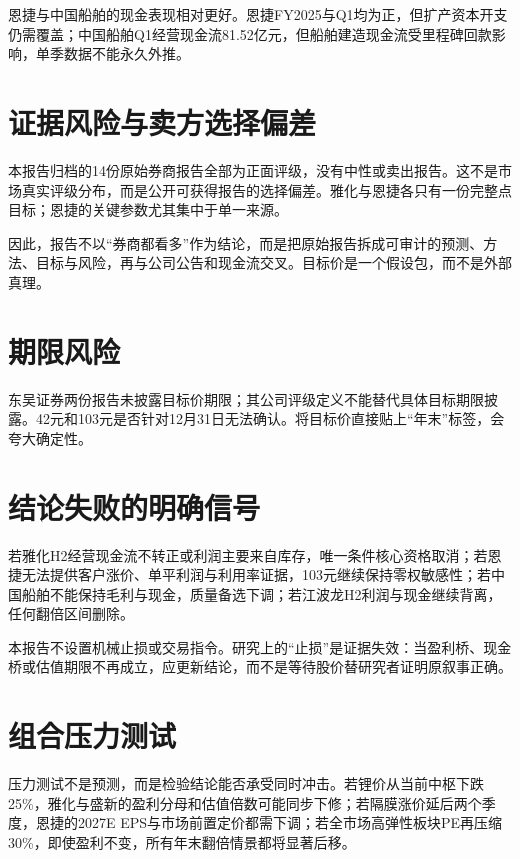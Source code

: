恩捷与中国船舶的现金表现相对更好。恩捷FY2025与Q1均为正，但扩产资本开支仍需覆盖；中国船舶Q1经营现金流81.52亿元，但船舶建造现金流受里程碑回款影响，单季数据不能永久外推。

\section{证据风险与卖方选择偏差}

本报告归档的14份原始券商报告全部为正面评级，没有中性或卖出报告。这不是市场真实评级分布，而是公开可获得报告的选择偏差。雅化与恩捷各只有一份完整点目标；恩捷的关键参数尤其集中于单一来源。

因此，报告不以“券商都看多”作为结论，而是把原始报告拆成可审计的预测、方法、目标与风险，再与公司公告和现金流交叉。目标价是一个假设包，而不是外部真理。

\section{期限风险}

东吴证券两份报告未披露目标价期限；其公司评级定义不能替代具体目标期限披露。42元和103元是否针对12月31日无法确认。将目标价直接贴上“年末”标签，会夸大确定性。

\section{结论失败的明确信号}

若雅化H2经营现金流不转正或利润主要来自库存，唯一条件核心资格取消；若恩捷无法提供客户涨价、单平利润与利用率证据，103元继续保持零权敏感性；若中国船舶不能保持毛利与现金，质量备选下调；若江波龙H2利润与现金继续背离，任何翻倍区间删除。

\begin{riskbox}[风险纪律]
本报告不设置机械止损或交易指令。研究上的“止损”是证据失效：当盈利桥、现金桥或估值期限不再成立，应更新结论，而不是等待股价替研究者证明原叙事正确。
\end{riskbox}

\section{组合压力测试}

压力测试不是预测，而是检验结论能否承受同时冲击。若锂价从当前中枢下跌25\%，雅化与盛新的盈利分母和估值倍数可能同步下修；若隔膜涨价延后两个季度，恩捷的2027E EPS与市场前置定价都需下调；若全市场高弹性板块PE再压缩30\%，即使盈利不变，所有年末翻倍情景都将显著后移。

